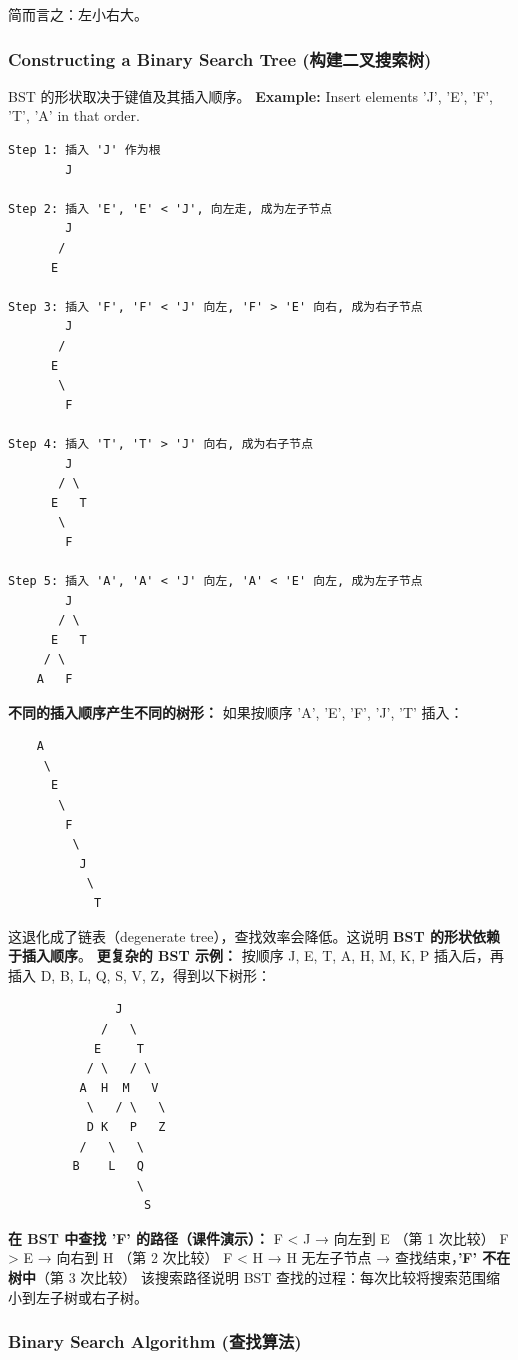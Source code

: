\documentclass[10pt,a4paper,openany]{ctexbook}
\theoremstyle{definition}
\theoremstyle{remark}
\renewenvironment{quote}
  {\list{}{\leftmargin=1em\rightmargin=0pt\topsep=0.5pt\partopsep=0pt}\item[]}
  {\endlist}
\begin{document}
\begin{quote}
简而言之：左小右大。

\end{quote}

\subsubsection{Constructing a Binary Search Tree (构建二叉搜索树)}

BST 的形状取决于键值及其插入顺序。
\textbf{Example:} Insert elements 'J', 'E', 'F', 'T', 'A' in that order.
{\footnotesize\begin{verbatim}
Step 1: 插入 'J' 作为根
        J

Step 2: 插入 'E', 'E' < 'J', 向左走, 成为左子节点
        J
       /
      E

Step 3: 插入 'F', 'F' < 'J' 向左, 'F' > 'E' 向右, 成为右子节点
        J
       /
      E
       \
        F

Step 4: 插入 'T', 'T' > 'J' 向右, 成为右子节点
        J
       / \
      E   T
       \
        F

Step 5: 插入 'A', 'A' < 'J' 向左, 'A' < 'E' 向左, 成为左子节点
        J
       / \
      E   T
     / \
    A   F
\end{verbatim}}

\textbf{不同的插入顺序产生不同的树形：}
如果按顺序 'A', 'E', 'F', 'J', 'T' 插入：
{\footnotesize\begin{verbatim}
    A
     \
      E
       \
        F
         \
          J
           \
            T
\end{verbatim}}

这退化成了链表（degenerate tree），查找效率会降低。这说明 \textbf{BST 的形状依赖于插入顺序}。
\textbf{更复杂的 BST 示例：}
按顺序 J, E, T, A, H, M, K, P 插入后，再插入 D, B, L, Q, S, V, Z，得到以下树形：
{\footnotesize\begin{verbatim}
               J
             /   \
            E     T
           / \   / \
          A  H  M   V
           \   / \   \
           D K   P   Z
          /   \   \
         B    L   Q
                  \
                   S
\end{verbatim}}

\textbf{在 BST 中查找 'F' 的路径（课件演示）：}
F < J → 向左到 E （第 1 次比较）
F > E → 向右到 H （第 2 次比较）
F < H → H 无左子节点 → 查找结束，\textbf{'F' 不在树中}（第 3 次比较）
该搜索路径说明 BST 查找的过程：每次比较将搜索范围缩小到左子树或右子树。
\subsubsection{Binary Search Algorithm (查找算法)}
\end{document}
